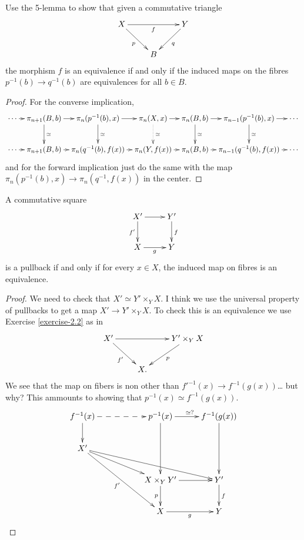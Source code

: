 \begin{exercise}[2.2]
\label{exercise-2.2}
Use the 5-lemma to show that given a commutative triangle
$$
\xymatrix{
X \ar[rd]_{p} \ar[rr]_{f} && Y \ar[dl]^{q} \\
& B
}
$$
the morphism $f$ is an equivalence if and only if
the induced maps on the fibres
$p^{-1}(b)\to q^{-1}(b)$ are equivalences for all $b \in B$.
\end{exercise}

\begin{proof}
For the converse implication,
$$
\xymatrixcolsep{.7em}
\xymatrix{
\cdots \ar[r]&\pi_{n+1}(B,b)\ar[r]\ar[d]^{\simeq}
&\pi_n(p^{-1}(b),x)\ar[r]\ar[d]^{\simeq}
&\pi_n(X,x)\ar[r]\ar@{.>}[d]^{\simeq }
&\pi_n(B,b)\ar[r]\ar[d]^{\simeq}
&\pi_{n-1}(p^{-1}(b),x)\ar[d]^{\simeq}\ar[r]
&\cdots\\
\cdots\ar[r]
&\pi_{n+1}(B,b)\ar[r]
&\pi_n(q^{-1}(b),f(x))\ar[r]
&\pi_n(Y,f(x))\ar[r]
&\pi_n(B,b)\ar[r]
&\pi_{n-1}(q^{-1}(b),f(x))\ar[r]
&\cdots
}
$$
and for the forward implication just do the same with
the map $\pi_n(p^{-1}(b),x)\to \pi_n(q^{-1},f(x))$ in the center.
\end{proof}

\begin{lemma}
\label{lemma-pullback-iff-fiber-maps-are-equivalences-groupoids}
A commutative square
$$
\xymatrix{
X'\ar[r]\ar[d]_{f'}&Y'\ar[d]^{f}\\
X\ar[r]_{g}&Y
}
$$
is a pullback if and only if for every $x \in X$,
the induced map on fibres is an equivalence.
\end{lemma}

\begin{proof}
We need to check that $X' \simeq Y'\times_Y X$.
I think we use the universal property of pullbacks
to get a map $X' \to Y'\times_YX$.
To check this is an equivalence we use 
Exercise \ref{exercise-2.2} as in
$$
\xymatrix{
X' \ar[rd]_{f'} \ar[rr] && Y'\times_YX \ar[dl]^p \\
& X.
}
$$
We see that the map on fibers is non other
than $f'^{-1}(x) \to f^{-1}(g(x))$… but why?
This ammounts to showing that  $p^{-1}(x)\simeq f^{-1}(g(x))$.
$$
\xymatrix{
f^{-1}(x)\ar[d]\ar@{-->}[rr]
& & p^{-1}(x)\ar[dd]\ar[r]^{\simeq?}
&f^{-1}(g(x))\ar[dd]\\
X' \ar[rrrd] \ar[rrd] \ar[rrdd]_{f'} & & \\
& & X \times_YY' \ar[d]_p \ar[r] & Y' \ar[d]^f \\
& & X \ar[r]_g & Y
}
$$
\end{proof}

